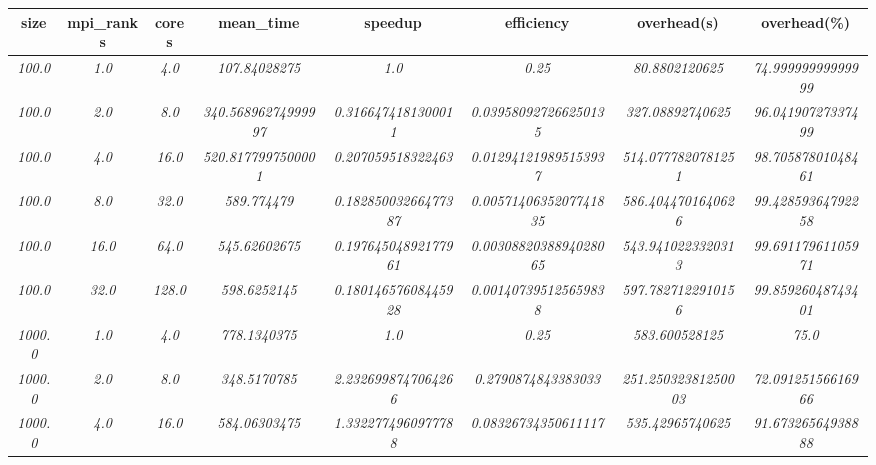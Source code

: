 \documentclass[../main.tex]{subfiles}
\begin{document}
\begin{table}[]
\begin{tabular}{|c|c|c|c|c|c|c|c|}
\hline
\textbf{size}   & \textbf{mpi\_ranks} & \textbf{cores} & \textbf{mean\_time}         & \textbf{speedup}             & \textbf{efficiency}            & \textbf{overhead(s)}        & \textbf{overhead(\%)}      \\ \hline
\textit{100.0}  & \textit{1.0}        & \textit{4.0}   & \textit{107.84028275}       & \textit{1.0}                 & \textit{0.25}                  & \textit{80.8802120625}      & \textit{74.99999999999999} \\
\textit{100.0}  & \textit{2.0}        & \textit{8.0}   & \textit{340.56896274999997} & \textit{0.3166474181300011}  & \textit{0.039580927266250135}  & \textit{327.08892740625}    & \textit{96.04190727337499} \\
\textit{100.0}  & \textit{4.0}        & \textit{16.0}  & \textit{520.8177997500001}  & \textit{0.207059518322463}   & \textit{0.012941219895153937}  & \textit{514.0777820781251}  & \textit{98.70587801048461} \\
\textit{100.0}  & \textit{8.0}        & \textit{32.0}  & \textit{589.774479}         & \textit{0.18285003266477387} & \textit{0.0057140635207741835} & \textit{586.4044701640626}  & \textit{99.42859364792258} \\
\textit{100.0}  & \textit{16.0}       & \textit{64.0}  & \textit{545.62602675}       & \textit{0.19764504892177961} & \textit{0.0030882038894028065} & \textit{543.9410223320313}  & \textit{99.69117961105971} \\
\textit{100.0}  & \textit{32.0}       & \textit{128.0} & \textit{598.6252145}        & \textit{0.18014657608445928} & \textit{0.001407395125659838}  & \textit{597.7827122910156}  & \textit{99.85926048743401} \\
\textit{1000.0} & \textit{1.0}        & \textit{4.0}   & \textit{778.1340375}        & \textit{1.0}                 & \textit{0.25}                  & \textit{583.600528125}      & \textit{75.0}              \\
\textit{1000.0} & \textit{2.0}        & \textit{8.0}   & \textit{348.5170785}        & \textit{2.2326998747064266}  & \textit{0.2790874843383033}    & \textit{251.25032381250003} & \textit{72.09125156616966} \\
\textit{1000.0} & \textit{4.0}        & \textit{16.0}  & \textit{584.06303475}       & \textit{1.3322774960977788}  & \textit{0.08326734350611117}   & \textit{535.42965740625}    & \textit{91.67326564938888} \\

\end{tabular}
\end{table}
\end{document}
